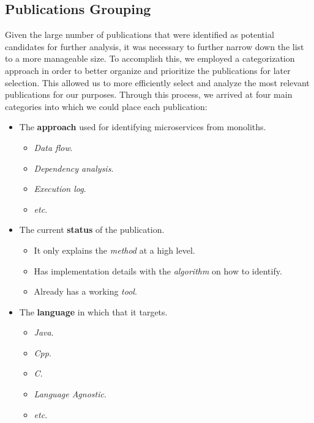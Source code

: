 \documentclass[conference]{IEEEtran}
\begin{document}
\subsection{Publications Grouping}

Given the large number of publications that were identified as potential
candidates for further analysis, it was necessary to further narrow down the
list to a more manageable size. To accomplish this, we employed a
categorization approach in order to better organize and prioritize the
publications for later selection. This allowed us to more efficiently select
and analyze the most relevant publications for our purposes. Through this
process, we arrived at four main categories into which we could place each
publication:

\begin{itemize}
  \item The \textbf{approach} used for identifying microservices from monoliths.
  \begin{itemize}
    \item \textit{Data flow}.
    \item \textit{Dependency analysis}.
    \item \textit{Execution log}.
    \item \textit{etc}.
  \end{itemize}
  \item The current \textbf{status} of the publication.
  \begin{itemize}
    \item It only explains the \textit{method} at a high level.
    \item Has implementation details with the \textit{algorithm} on how to identify.
    \item Already has a working \textit{tool}.
  \end{itemize}
  \item The \textbf{language} in which that it targets.
  \begin{itemize}
    \item \textit{Java}.
    \item \textit{Cpp}.
    \item \textit{C}.
    \item \textit{Language Agnostic}.
    \item \textit{etc}.
  \end{itemize}
\end{itemize}
\end{document}
